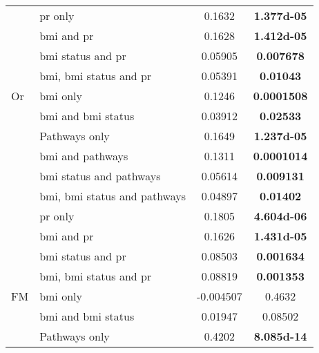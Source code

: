 \begin{ThreePartTable}
\begin{longtable}{llcc}
		                                  & \gls{pr} only                            & 0.1632     & \bfseries \num{1.377d-05} \\
		                                  & \gls{bmi} and \gls{pr}                   & 0.1628     & \bfseries \num{1.412d-05} \\
		                                  & \gls{bmi} status and \gls{pr}            & 0.05905    & \bfseries 0.007678  \\
		                                  & \gls{bmi}, \gls{bmi} status and \gls{pr} & 0.05391    & \bfseries 0.01043   \\
				\hline
				\rule{0pt}{2.25ex}Or      & \gls{bmi} only                           & 0.1246     & \bfseries 0.0001508 \\
		                                  & \gls{bmi} and \gls{bmi} status           & 0.03912    & \bfseries 0.02533   \\
		                                  & Pathways only                            & 0.1649     & \bfseries \num{1.237d-05} \\
		                                  & \gls{bmi} and pathways                   & 0.1311     & \bfseries 0.0001014 \\
		                                  & \gls{bmi} status and pathways            & 0.05614    & \bfseries 0.009131  \\
		                                  & \gls{bmi}, \gls{bmi} status and pathways & 0.04897    & \bfseries 0.01402   \\
		                                  & \gls{pr} only                            & 0.1805     & \bfseries \num{4.604d-06} \\
		                                  & \gls{bmi} and \gls{pr}                   & 0.1626     & \bfseries \num{1.431d-05} \\
		                                  & \gls{bmi} status and \gls{pr}            & 0.08503    & \bfseries 0.001634  \\
		                                  & \gls{bmi}, \gls{bmi} status and \gls{pr} & 0.08819    & \bfseries 0.001353  \\
				\hline
				\rule{0pt}{2.25ex}FM      & \gls{bmi} only                           & -0.004507  & 0.4632    \\
		                                  & \gls{bmi} and \gls{bmi} status           & 0.01947    & 0.08502   \\
		                                  & Pathways only                            & 0.4202     & \bfseries \num{8.085d-14} \\

\end{longtable}
\end{ThreePartTable}
